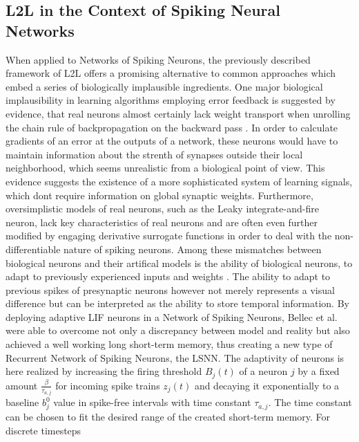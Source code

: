 \documentclass[letterpaper, 10 pt, conference]{ieeeconf}  %
\begin{document}
\subsection{L2L in the Context of Spiking Neural Networks}
When applied to Networks of Spiking Neurons, the previously described framework of L2L offers a promising alternative
to common approaches which embed a series of biologically implausible ingredients. One major biological implausibility
in learning algorithms employing error feedback is suggested by evidence, that real neurons almost certainly lack weight transport
when unrolling the chain rule of backpropagation on the backward pass\cite{samadiDeepLearningDynamic2017}
\cite{chintaAdaptiveOptimalControl2012}\cite{crickRecentExcitementNeural1989}. In order 
to calculate gradients
of an error at the outputs of a network, these neurons would have to maintain information about the strenth of synapses outside their local
neighborhood, which seems unrealistic from a biological point of view. This evidence suggests the existence of a more sophisticated 
system of learning signals, which dont require information on global synaptic weights. Furthermore, oversimplistic models of real
neurons, such as the Leaky integrate-and-fire neuron, lack key characteristics of real neurons and are often even further modified by engaging
derivative surrogate functions in order to deal with the non-differentiable nature of spiking neurons. Among these mismatches between 
biological neurons and their artifical models is the ability of biological neurons, to adapt to previously experienced inputs
and weights \cite{samadiDeepLearningDynamic2017}. The ability to adapt to previous spikes of presynaptic neurons however not merely represents a visual
difference but can be interpreted as the ability to store temporal information. \newline
By deploying adaptive LIF neurons in a Network of Spiking Neurons, Bellec et al.\cite{bellecLongShorttermMemory2018} were able to overcome not only a 
discrepancy between model and reality but also achieved a well working long short-term memory, thus creating a new type of Recurrent
Network of Spiking Neurons, the LSNN. The adaptivity of neurons is here realized by increasing the firing threshold $B_j(t)$ of a neuron $j$
by a fixed amount $\frac{\beta}{\tau_{a,j}}$ for incoming spike trains $z_j(t)$ and decaying it exponentially to a baseline $b^0_j$ value in spike-free intervals 
with time constant $\tau_{a,j}$. The time constant can be chosen to fit the desired range of the created short-term memory. For discrete timesteps
\end{document}

